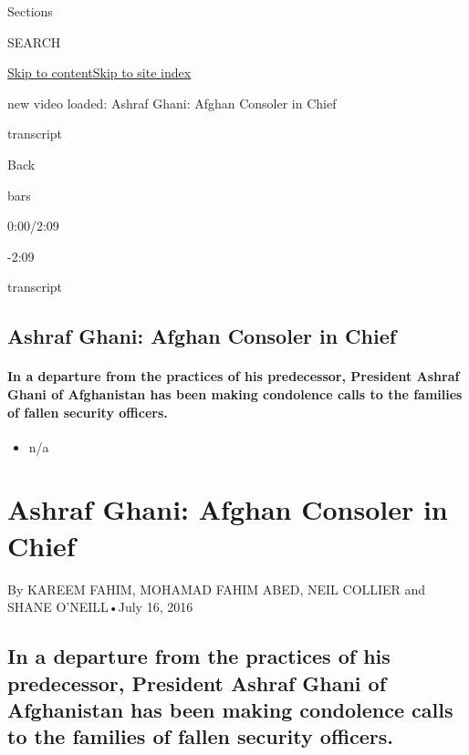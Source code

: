 Sections

SEARCH

\protect\hyperlink{site-content}{Skip to
content}\protect\hyperlink{site-index}{Skip to site index}

new video loaded: Ashraf Ghani: Afghan Consoler in Chief

transcript

Back

bars

0:00/2:09

-2:09

transcript

\hypertarget{ashraf-ghani-afghan-consoler-in-chief}{%
\subsection{Ashraf Ghani: Afghan Consoler in
Chief}\label{ashraf-ghani-afghan-consoler-in-chief}}

\hypertarget{in-a-departure-from-the-practices-of-his-predecessor-president-ashraf-ghani-of-afghanistan-has-been-making-condolence-calls-to-the-families-of-fallen-security-officers}{%
\paragraph{In a departure from the practices of his predecessor,
President Ashraf Ghani of Afghanistan has been making condolence calls
to the families of fallen security
officers.}\label{in-a-departure-from-the-practices-of-his-predecessor-president-ashraf-ghani-of-afghanistan-has-been-making-condolence-calls-to-the-families-of-fallen-security-officers}}

\begin{itemize}
\tightlist
\item
  n/a
\end{itemize}

\hypertarget{ashraf-ghani-afghan-consoler-in-chief-1}{%
\section{Ashraf Ghani: Afghan Consoler in
Chief}\label{ashraf-ghani-afghan-consoler-in-chief-1}}

By KAREEM FAHIM, MOHAMAD FAHIM ABED, NEIL COLLIER and SHANE O'NEILL•July
16, 2016

\hypertarget{in-a-departure-from-the-practices-of-his-predecessor-president-ashraf-ghani-of-afghanistan-has-been-making-condolence-calls-to-the-families-of-fallen-security-officers-1}{%
\subsection{In a departure from the practices of his predecessor,
President Ashraf Ghani of Afghanistan has been making condolence calls
to the families of fallen security
officers.}\label{in-a-departure-from-the-practices-of-his-predecessor-president-ashraf-ghani-of-afghanistan-has-been-making-condolence-calls-to-the-families-of-fallen-security-officers-1}}

